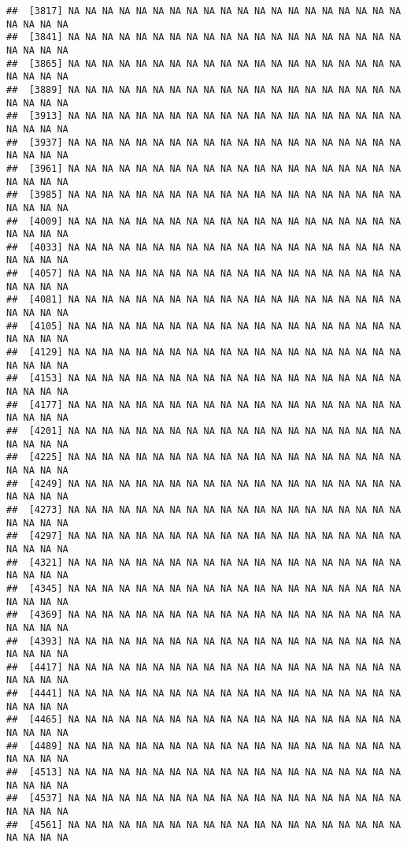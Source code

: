 \documentclass[
]{article}
\begin{document}
\begin{verbatim}
##  [3817] NA NA NA NA NA NA NA NA NA NA NA NA NA NA NA NA NA NA NA NA NA NA NA NA
##  [3841] NA NA NA NA NA NA NA NA NA NA NA NA NA NA NA NA NA NA NA NA NA NA NA NA
##  [3865] NA NA NA NA NA NA NA NA NA NA NA NA NA NA NA NA NA NA NA NA NA NA NA NA
##  [3889] NA NA NA NA NA NA NA NA NA NA NA NA NA NA NA NA NA NA NA NA NA NA NA NA
##  [3913] NA NA NA NA NA NA NA NA NA NA NA NA NA NA NA NA NA NA NA NA NA NA NA NA
##  [3937] NA NA NA NA NA NA NA NA NA NA NA NA NA NA NA NA NA NA NA NA NA NA NA NA
##  [3961] NA NA NA NA NA NA NA NA NA NA NA NA NA NA NA NA NA NA NA NA NA NA NA NA
##  [3985] NA NA NA NA NA NA NA NA NA NA NA NA NA NA NA NA NA NA NA NA NA NA NA NA
##  [4009] NA NA NA NA NA NA NA NA NA NA NA NA NA NA NA NA NA NA NA NA NA NA NA NA
##  [4033] NA NA NA NA NA NA NA NA NA NA NA NA NA NA NA NA NA NA NA NA NA NA NA NA
##  [4057] NA NA NA NA NA NA NA NA NA NA NA NA NA NA NA NA NA NA NA NA NA NA NA NA
##  [4081] NA NA NA NA NA NA NA NA NA NA NA NA NA NA NA NA NA NA NA NA NA NA NA NA
##  [4105] NA NA NA NA NA NA NA NA NA NA NA NA NA NA NA NA NA NA NA NA NA NA NA NA
##  [4129] NA NA NA NA NA NA NA NA NA NA NA NA NA NA NA NA NA NA NA NA NA NA NA NA
##  [4153] NA NA NA NA NA NA NA NA NA NA NA NA NA NA NA NA NA NA NA NA NA NA NA NA
##  [4177] NA NA NA NA NA NA NA NA NA NA NA NA NA NA NA NA NA NA NA NA NA NA NA NA
##  [4201] NA NA NA NA NA NA NA NA NA NA NA NA NA NA NA NA NA NA NA NA NA NA NA NA
##  [4225] NA NA NA NA NA NA NA NA NA NA NA NA NA NA NA NA NA NA NA NA NA NA NA NA
##  [4249] NA NA NA NA NA NA NA NA NA NA NA NA NA NA NA NA NA NA NA NA NA NA NA NA
##  [4273] NA NA NA NA NA NA NA NA NA NA NA NA NA NA NA NA NA NA NA NA NA NA NA NA
##  [4297] NA NA NA NA NA NA NA NA NA NA NA NA NA NA NA NA NA NA NA NA NA NA NA NA
##  [4321] NA NA NA NA NA NA NA NA NA NA NA NA NA NA NA NA NA NA NA NA NA NA NA NA
##  [4345] NA NA NA NA NA NA NA NA NA NA NA NA NA NA NA NA NA NA NA NA NA NA NA NA
##  [4369] NA NA NA NA NA NA NA NA NA NA NA NA NA NA NA NA NA NA NA NA NA NA NA NA
##  [4393] NA NA NA NA NA NA NA NA NA NA NA NA NA NA NA NA NA NA NA NA NA NA NA NA
##  [4417] NA NA NA NA NA NA NA NA NA NA NA NA NA NA NA NA NA NA NA NA NA NA NA NA
##  [4441] NA NA NA NA NA NA NA NA NA NA NA NA NA NA NA NA NA NA NA NA NA NA NA NA
##  [4465] NA NA NA NA NA NA NA NA NA NA NA NA NA NA NA NA NA NA NA NA NA NA NA NA
##  [4489] NA NA NA NA NA NA NA NA NA NA NA NA NA NA NA NA NA NA NA NA NA NA NA NA
##  [4513] NA NA NA NA NA NA NA NA NA NA NA NA NA NA NA NA NA NA NA NA NA NA NA NA
##  [4537] NA NA NA NA NA NA NA NA NA NA NA NA NA NA NA NA NA NA NA NA NA NA NA NA
##  [4561] NA NA NA NA NA NA NA NA NA NA NA NA NA NA NA NA NA NA NA NA NA NA NA NA

\end{verbatim}
\end{document}

